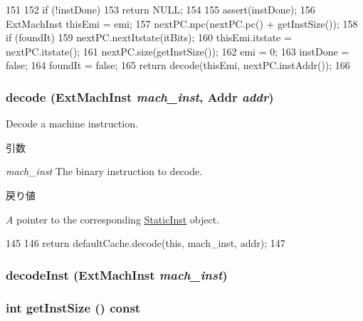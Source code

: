 \begin{DoxyCode}
151     {
152         if (!instDone)
153             return NULL;
154 
155         assert(instDone);
156         ExtMachInst thisEmi = emi;
157         nextPC.npc(nextPC.pc() + getInstSize());
158         if (foundIt)
159             nextPC.nextItstate(itBits);
160         thisEmi.itstate = nextPC.itstate();
161         nextPC.size(getInstSize());
162         emi = 0;
163         instDone = false;
164         foundIt = false;
165         return decode(thisEmi, nextPC.instAddr());
166     }
\end{DoxyCode}
\hypertarget{classArmISA_1_1Decoder_a4ed948f8d08575cc2916fe32154ea69d}{
\subsubsection[{decode}]{ decode (ExtMachInst {\em mach\_\-inst}, \/  {\bf Addr} {\em addr})}}
\label{classArmISA_1_1Decoder_a4ed948f8d08575cc2916fe32154ea69d}
Decode a machine instruction. 
\begin{DoxyParams}{引数}
\item[{\em mach\_\-inst}]The binary instruction to decode. \end{DoxyParams}

\begin{DoxyRetVals}{戻り値}
\item[{\em A}]pointer to the corresponding \hyperlink{classStaticInst}{StaticInst} object. \end{DoxyRetVals}



\begin{DoxyCode}
145     {
146         return defaultCache.decode(this, mach_inst, addr);
147     }
\end{DoxyCode}
\hypertarget{classArmISA_1_1Decoder_a148768e0e9062eb41f604040d0ea86e6}{
\subsubsection[{decodeInst}]{ decodeInst (ExtMachInst {\em mach\_\-inst})}}
\label{classArmISA_1_1Decoder_a148768e0e9062eb41f604040d0ea86e6}
\hypertarget{classArmISA_1_1Decoder_a55ee00e46b2bd37b77e07a2ccd69eafe}{
\subsubsection[{getInstSize}]{\setlength{\rightskip}{0pt plus 5cm}int getInstSize () const}}
\label{classArmISA_1_1Decoder_a55ee00e46b2bd37b77e07a2ccd69eafe}



